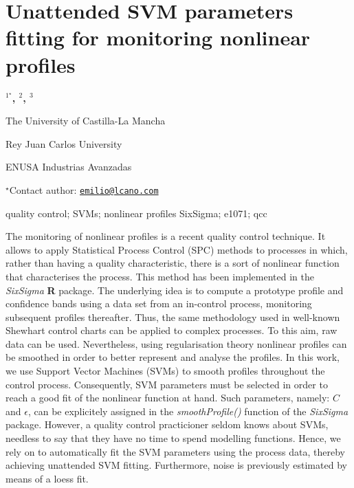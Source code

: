 \documentclass[\main/boa.tex]{subfiles}
\begin{document}
\section{Unattended SVM parameters fitting for monitoring nonlinear profiles}

\begin{center}
  {\bf {}$^{1^\star}$, $^{2}$, $^{3}$}
\end{center}

\vskip 0.3cm

\begin{affiliations}
\begin{enumerate}
\begin{minipage}{0.915\textwidth}
\centering
\item The University of Castilla-La Mancha \\[-2pt]
\item Rey Juan Carlos University \\[-2pt]
\item ENUSA Industrias Avanzadas \\[-2pt]
\end{minipage}
\end{enumerate}
$^\star$Contact author: \href{mailto:emilio@lcano.com}{\nolinkurl{emilio@lcano.com}}\\
\end{affiliations}

\vskip 0.5cm

\begin{minipage}{0.915\textwidth}
\keywords quality control; SVMs; nonlinear profiles
\packages SixSigma; e1071; qcc
\end{minipage}

\vskip 0.8cm

The monitoring of nonlinear profiles is a recent quality control
technique. It allows to apply Statistical Process Control (SPC) methods
to processes in which, rather than having a quality characteristic,
there is a sort of nonlinear function that characterises the process.
This method has been implemented in the \emph{SixSigma} \textbf{R}
package. The underlying idea is to compute a prototype profile and
confidence bands using a data set from an in-control process, monitoring
subsequent profiles thereafter. Thus, the same methodology used in
well-known Shewhart control charts can be applied to complex processes.
To this aim, raw data can be used. Nevertheless, using regularisation
theory nonlinear profiles can be smoothed in order to better represent
and analyse the profiles. In this work, we use Support Vector Machines
(SVMs) to smooth profiles throughout the control process. Consequently,
SVM parameters must be selected in order to reach a good fit of the
nonlinear function at hand. Such parameters, namely: \(C\) and
\(\epsilon\), can be explicitely assigned in the \emph{smoothProfile()}
function of the \emph{SixSigma} package. However, a quality control
practicioner seldom knows about SVMs, needless to say that they have no
time to spend modelling functions. Hence, we rely on to automatically
fit the SVM parameters using the process data, thereby achieving
unattended SVM fitting. Furthermore, noise is previously estimated by
means of a loess fit.
\end{document}
